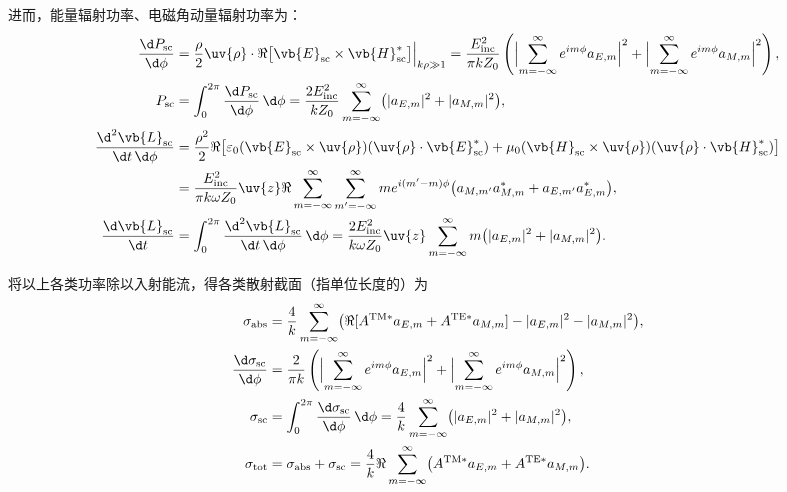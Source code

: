 进而，能量辐射功率、电磁角动量辐射功率为：
\begin{align*}
	\frac{\d P_{\rm sc}}{\d \phi}              & = \frac{\rho}{2} \uv{\rho} \cdot \Re\bigl[ \vb{E}_{\rm sc} \times \vb{H}_{\rm sc}^* \bigr] \Big|_{k\rho \gg 1}
	= \frac{E_{\rm inc}^2}{\pi k Z_0} \left( \Bigl| \sum_{m=-\infty}^{\infty} e^{im\phi} a_{E,m} \Bigr|^2 + \Bigl| \sum_{m=-\infty}^{\infty} e^{im\phi} a_{M,m} \Bigr|^2 \right),                                                                      \\
	P_{\rm sc}                                 & = \int_0^{2\pi} \frac{\d P_{\rm sc}}{\d \phi} \,\d \phi
	= \frac{2E_{\rm inc}^2}{k Z_0} \sum_{m=-\infty}^{\infty} \bigl( |a_{E,m}|^2 + |a_{M,m}|^2 \bigr),                                                                                                                                                  \\
	\frac{\d^2 \vb{L}_{\rm sc}}{\d t\,\d \phi} & = \frac{\rho^2}{2} \Re\bigl[ \varepsilon_0 (\vb{E}_{\rm sc} \times \uv{\rho})(\uv{\rho} \cdot \vb{E}_{\rm sc}^*) + \mu_0 (\vb{H}_{\rm sc} \times \uv{\rho})(\uv{\rho} \cdot \vb{H}_{\rm sc}^*) \bigr] \\
	                                           & = \frac{E_{\rm inc}^2}{\pi k \omega Z_0} \uv{z} \Re \sum_{m=-\infty}^{\infty} \sum_{m'=-\infty}^{\infty} m e^{i(m'-m)\phi} \bigl( a_{M,m'} a_{M,m}^* + a_{E,m'} a_{E,m}^* \bigr),                     \\
	\frac{\d \vb{L}_{\rm sc}}{\d t}            & = \int_0^{2\pi} \frac{\d^2 \vb{L}_{\rm sc}}{\d t\,\d \phi} \,\d \phi
	= \frac{2E_{\rm inc}^2}{k \omega Z_0} \uv{z} \sum_{m=-\infty}^{\infty} m \bigl( |a_{E,m}|^2 + |a_{M,m}|^2 \bigr).
\end{align*}

将以上各类功率除以入射能流，得各类散射截面（指单位长度的）为
\begin{align*}
	\sigma_{\rm abs}                   & = \frac{4}{k} \sum_{m=-\infty}^{\infty} \bigl( \Re[A^{\rm TM*} a_{E,m} + A^{\rm TE*} a_{M,m}] - |a_{E,m}|^2 - |a_{M,m}|^2 \bigr),                             \\
	\frac{\d \sigma_{\rm sc}}{\d \phi} & = \frac{2}{\pi k} \left( \Bigl| \sum_{m=-\infty}^{\infty} e^{im\phi} a_{E,m} \Bigr|^2 + \Bigl| \sum_{m=-\infty}^{\infty} e^{im\phi} a_{M,m} \Bigr|^2 \right), \\
	\sigma_{\rm sc}                    & = \int_0^{2\pi} \frac{\d \sigma_{\rm sc}}{\d \phi} \,\d \phi
	= \frac{4}{k} \sum_{m=-\infty}^{\infty} \bigl( |a_{E,m}|^2 + |a_{M,m}|^2 \bigr),                                                                                                                   \\
	\sigma_{\rm tot}                   & = \sigma_{\rm abs} + \sigma_{\rm sc}
	= \frac{4}{k} \Re \sum_{m=-\infty}^{\infty} \bigl( A^{\rm TM*} a_{E,m} + A^{\rm TE*} a_{M,m} \bigr).
\end{align*}

